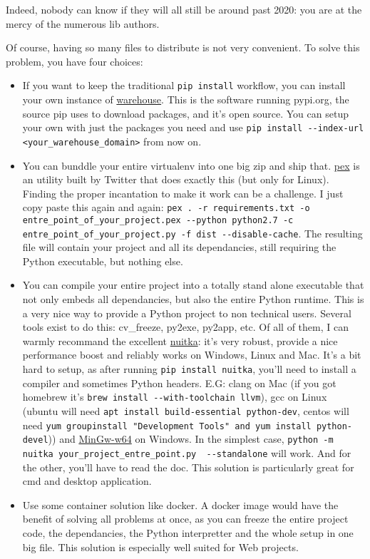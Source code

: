 Indeed, nobody can know if they will all still be around past 2020: you are at the mercy of the numerous lib authors.

Of course, having so many files to distribute is not very convenient. To solve this problem, you have four choices:

\begin{itemize}

\item If you want to keep the traditional \lstinline{pip install} workflow, you can install your own instance of \href{https://github.com/pypa/warehouse}{warehouse}. This is the software running pypi.org, the source pip uses to download packages, and it's open source. You can setup your own with just the packages you need and use \lstinline{pip install --index-url <your_warehouse_domain>} from now on.
\item You can bunddle your entire virtualenv into one big zip and ship that. \href{https://github.com/pantsbuild/pex}{pex} is an utility built by Twitter that does exactly this (but only for Linux). Finding the proper incantation to make it work can be a challenge. I just copy paste this again and again: \lstinline{pex . -r requirements.txt -o entre_point_of_your_project.pex --python python2.7 -c entre_point_of_your_project.py -f dist --disable-cache}. The resulting file will contain your project and all its dependancies, still requiring the Python executable, but nothing else.
\item You can compile your entire project into a totally stand alone executable that not only embeds all dependancies, but also the entire Python runtime. This is a very nice way to provide a Python project to non technical users. Several tools exist to do this: cv\_freeze, py2exe, py2app, etc. Of all of them, I can warmly recommand the excellent \href{nuitka.net}{nuitka}: it's very robust, provide a nice performance boost and reliably works on Windows, Linux and Mac. It's a bit hard to setup, as after running \lstinline{pip install nuitka}, you'll need to install a compiler and sometimes Python headers. E.G: clang on Mac  (if you got homebrew it's \lstinline{brew install --with-toolchain llvm}), gcc on Linux (ubuntu will need \lstinline{apt install build-essential python-dev}, centos will need \lstinline{yum groupinstall "Development Tools" and yum install python-devel})) and \href{https://sourceforge.net/projects/mingw-w64/}{MinGw-w64} on Windows. In the simplest case, \lstinline{python -m nuitka your_project_entre_point.py  --standalone} will work. And for the other, you'll have to read the doc. This solution is particularly great for cmd and desktop application.
\item Use some container solution like docker. A docker image would have the benefit of solving all problems at once, as you can freeze the entire project code, the dependancies, the Python interpretter and the whole setup in one big file. This solution is especially well suited for Web projects.
\end{itemize}

